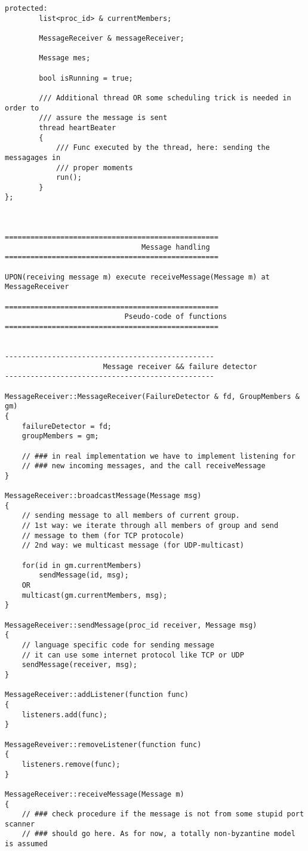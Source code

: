 {\begin{lstlisting}[frame=lines,caption=Pseudocode of Paxos algorithm]
	protected:
		list<proc_id> & currentMembers;
		
		MessageReceiver & messageReceiver;
		
		Message mes;
		
		bool isRunning = true;
		
		/// Additional thread OR some scheduling trick is needed in order to
		/// assure the message is sent
		thread heartBeater
		{
			/// Func executed by the thread, here: sending the messagages in
			/// proper moments
			run();
		}
};



==================================================
                                Message handling
==================================================

UPON(receiving message m) execute receiveMessage(Message m) at MessageReceiver

==================================================
                            Pseudo-code of functions
==================================================


-------------------------------------------------
                       Message receiver && failure detector
-------------------------------------------------

MessageReceiver::MessageReceiver(FailureDetector & fd, GroupMembers & gm)
{
	failureDetector = fd;
	groupMembers = gm;
	
	// ### in real implementation we have to implement listening for 
	// ### new incoming messages, and the call receiveMessage
}

MessageReceiver::broadcastMessage(Message msg)
{
	// sending message to all members of current group.
	// 1st way: we iterate through all members of group and send
	// message to them (for TCP protocole)
	// 2nd way: we multicast message (for UDP-multicast)
	
	for(id in gm.currentMembers)
		sendMessage(id, msg);
	OR
	multicast(gm.currentMembers, msg);
}

MessageReceiver::sendMessage(proc_id receiver, Message msg)
{
	// language specific code for sending message
	// it can use some internet protocol like TCP or UDP
	sendMessage(receiver, msg);
}

MessageReceiver::addListener(function func)
{
	listeners.add(func);
}

MessageReveiver::removeListener(function func)
{
	listeners.remove(func);
}
			   
MessageReceiver::receiveMessage(Message m)
{
	// ### check procedure if the message is not from some stupid port scanner
	// ### should go here. As for now, a totally non-byzantine model is assumed



\end{lstlisting}}
